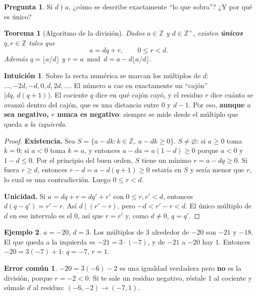 \documentclass[11pt,a4paper]{article}
\newtheorem{teorema}{Teorema}[section]
\theoremstyle{definition}
\newtheorem{ejemplo}[teorema]{Ejemplo}
\newcommand{\Z}{\mathbb{Z}}
\theoremstyle{notait}
\newtheorem*{pregunta}{Pregunta}
\theoremstyle{nota}
\newtheorem*{intuicion}{Intuición}
\newtheorem*{trampaX}{Error común}
\newenvironment{trampa}{\begin{trampaX}\leavevmode\marginpar{\raggedleft\vspace*{-0.9\baselineskip}\dbend}\ignorespaces}{\end{trampaX}}
\begin{document}
\begin{pregunta}
Si $d\nmid a$, ¿cómo se describe exactamente ``lo que sobra''? ¿Y por qué es único?
\end{pregunta}

\begin{teorema}[Algoritmo de la división]
Dados $a\in\Z$ y $d\in\Z^{+}$, existen \textbf{únicos} $q,r\in\Z$ tales que
\[ a=dq+r,\qquad 0\le r<d. \]
Además $q=\lfloor a/d\rfloor$ y $r=a\bmod d=a-d\lfloor a/d\rfloor$.
\end{teorema}

\begin{intuicion}
Sobre la recta numérica se marcan los múltiplos de $d$: $\dots,-2d,-d,0,d,2d,\dots$. El número $a$ cae en exactamente un ``cajón'' $[dq,\,d(q+1))$. El cociente $q$ dice en qué cajón cayó, y el residuo $r$ dice cuánto se avanzó dentro del cajón, que es una distancia entre $0$ y $d-1$. Por eso, \textbf{aunque $a$ sea negativo, $r$ nunca es negativo}: siempre se mide desde el múltiplo que queda \emph{a la izquierda}.
\end{intuicion}

\begin{proof}
\textbf{Existencia.} Sea $S=\{a-dk : k\in\Z,\ a-dk\ge 0\}$. $S\ne\varnothing$: si $a\ge 0$ toma $k=0$; si $a<0$ toma $k=a$, y entonces $a-da=a(1-d)\ge 0$ porque $a<0$ y $1-d\le 0$. Por el principio del buen orden, $S$ tiene un mínimo $r=a-dq\ge 0$. Si fuera $r\ge d$, entonces $r-d=a-d(q+1)\ge 0$ estaría en $S$ y sería menor que $r$, lo cual es una contradicción. Luego $0\le r<d$.

\textbf{Unicidad.} Si $a=dq+r=dq'+r'$ con $0\le r,r'<d$, entonces $d(q-q')=r'-r$. Así $d\mid(r'-r)$, pero $-d<r'-r<d$. El único múltiplo de $d$ en ese intervalo es el $0$, así que $r=r'$ y, como $d\ne0$, $q=q'$.
\end{proof}

\begin{ejemplo}
$a=-20$, $d=3$. Los múltiplos de 3 alrededor de $-20$ son $-21$ y $-18$. El que queda a la izquierda es $-21=3\cdot(-7)$, y de $-21$ a $-20$ hay $1$. Entonces $-20=3(-7)+1$: $q=-7$, $r=1$.
\end{ejemplo}

\begin{trampa}
$-20=3(-6)-2$ es una igualdad verdadera pero \textbf{no} es la división, porque $r=-2<0$. Si te sale un residuo negativo, réstale 1 al cociente y súmale $d$ al residuo: $(-6,-2)\to(-7,1)$.
\end{trampa}
\end{document}
